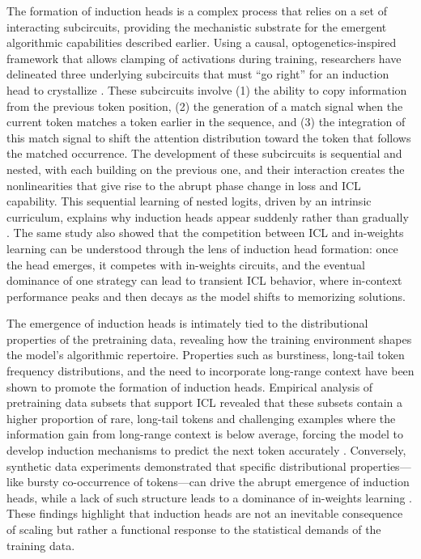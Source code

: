 \documentclass[11pt]{article}
\begin{document}
The formation of induction heads is a complex process that relies on a set of interacting subcircuits, providing the mechanistic substrate for the emergent algorithmic capabilities described earlier. Using a causal, optogenetics-inspired framework that allows clamping of activations during training, researchers have delineated three underlying subcircuits that must ``go right'' for an induction head to crystallize \cite{ref51}. These subcircuits involve (1) the ability to copy information from the previous token position, (2) the generation of a match signal when the current token matches a token earlier in the sequence, and (3) the integration of this match signal to shift the attention distribution toward the token that follows the matched occurrence. The development of these subcircuits is sequential and nested, with each building on the previous one, and their interaction creates the nonlinearities that give rise to the abrupt phase change in loss and ICL capability. This sequential learning of nested logits, driven by an intrinsic curriculum, explains why induction heads appear suddenly rather than gradually \cite{ref35}. The same study also showed that the competition between ICL and in-weights learning can be understood through the lens of induction head formation: once the head emerges, it competes with in-weights circuits, and the eventual dominance of one strategy can lead to transient ICL behavior, where in-context performance peaks and then decays as the model shifts to memorizing solutions.

The emergence of induction heads is intimately tied to the distributional properties of the pretraining data, revealing how the training environment shapes the model's algorithmic repertoire. Properties such as burstiness, long-tail token frequency distributions, and the need to incorporate long-range context have been shown to promote the formation of induction heads. Empirical analysis of pretraining data subsets that support ICL revealed that these subsets contain a higher proportion of rare, long-tail tokens and challenging examples where the information gain from long-range context is below average, forcing the model to develop induction mechanisms to predict the next token accurately \cite{ref36}. Conversely, synthetic data experiments demonstrated that specific distributional properties---like bursty co-occurrence of tokens---can drive the abrupt emergence of induction heads, while a lack of such structure leads to a dominance of in-weights learning \cite{ref35}. These findings highlight that induction heads are not an inevitable consequence of scaling but rather a functional response to the statistical demands of the training data.
\end{document}
